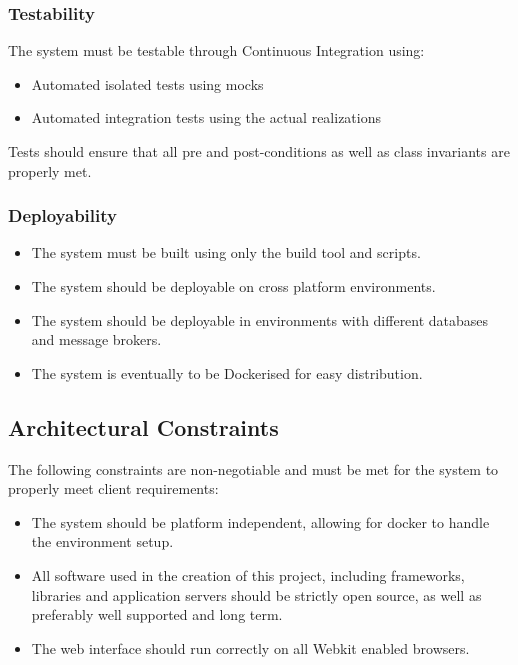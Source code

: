 \documentclass[11pt,a4paper]{article}
\begin{document}
\subsubsection{Testability}
The system must be testable through Continuous Integration using:  
\begin{itemize}
	\item Automated isolated tests using mocks
	\item Automated integration tests using the actual realizations 
\end{itemize}
Tests should ensure that all pre and post-conditions as well as class invariants are properly met.

\subsubsection{Deployability}
\begin{itemize}
	\item The system must be built using only the build tool and scripts.
	\item The system should be deployable on cross platform environments.
	\item The system should be deployable in environments with different databases and message brokers.
	\item The system is eventually to be Dockerised for easy distribution. 
\end{itemize}

\pagebreak

\subsection{Architectural Constraints}
The following constraints are non-negotiable and must be met for the system to properly meet client requirements:
\begin{itemize}
	\item The system should be platform independent, allowing for docker to handle the environment setup.
	\item All software used in the creation of this project, including frameworks, libraries and application servers should be strictly open source, as well as preferably well supported and long term.
	\item The web interface should run correctly on all Webkit enabled browsers.
\end{itemize}

\pagebreak
\end{document}
